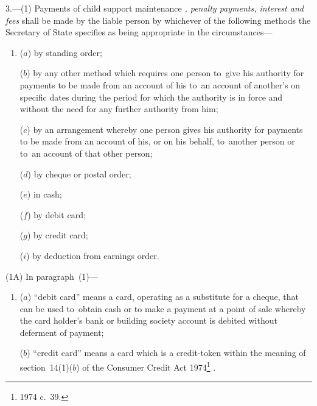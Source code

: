 \documentclass[12pt,a4paper]{article}
\begin{document}
3.—(1) Payments of child support maintenance%
\emph{, penalty payments, interest and fees}  %
shall be made by the liable person by whichever of the following methods the Secretary of State specifies as being appropriate in the circumstances—
\begin{enumerate}\item[]
($a$) by standing order;

($b$) by any other method which requires one person to~give his authority for payments to be made from an account of his to~an account of another’s on specific dates during the period for which the authority is in force and without the need for any further authority from him;

($c$) by an arrangement whereby one person gives his authority for payments to be made from an account of his, or on his behalf, to~another person or to~an account of that other person;

($d$) by cheque or postal order;

($e$) in cash;

($f$) by debit card;

($g$) by credit card;


($i$) by deduction from earnings order.
\end{enumerate}


(1A) In paragraph~(1)—
\begin{enumerate}\item[]
($a$) “debit card” means a card, operating as a substitute for a cheque, that can be used to~obtain cash or to make a payment at a point of sale whereby the card holder’s bank or building society account is debited without deferment of payment;

($b$) “credit card” means a card which is a credit-token within the meaning of section~14(1)($b$)  of the Consumer Credit Act 1974\footnote{1974 c.~39.}%
%
.
\end{enumerate}
\end{document}
